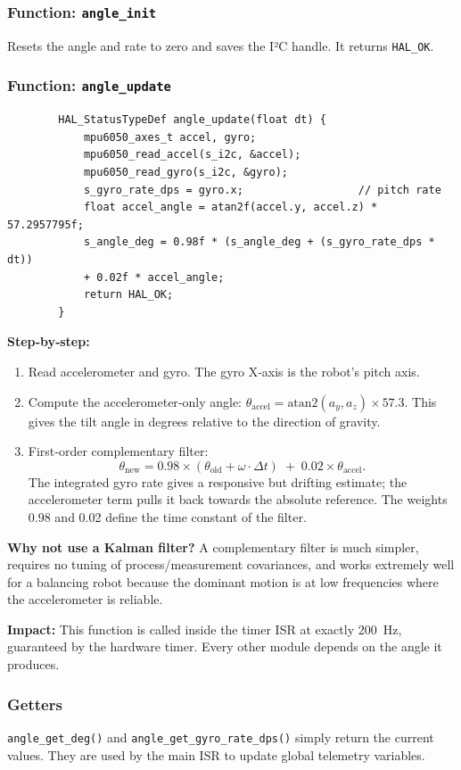 \documentclass[12pt,a4paper]{article}
\newcommand{\func}[1]{\texttt{#1}}
\begin{document}
	\subsubsection*{Function: \func{angle\_init}}
	Resets the angle and rate to zero and saves the I²C handle. It returns \texttt{HAL\_OK}.
	
	\newpage
	
	\subsubsection*{Function: \func{angle\_update}}
	\begin{lstlisting}
		HAL_StatusTypeDef angle_update(float dt) {
			mpu6050_axes_t accel, gyro;
			mpu6050_read_accel(s_i2c, &accel);
			mpu6050_read_gyro(s_i2c, &gyro);
			s_gyro_rate_dps = gyro.x;                  // pitch rate
			float accel_angle = atan2f(accel.y, accel.z) * 57.2957795f;
			s_angle_deg = 0.98f * (s_angle_deg + (s_gyro_rate_dps * dt))
			+ 0.02f * accel_angle;
			return HAL_OK;
		}
	\end{lstlisting}
	\textbf{Step‑by‑step:}
	\begin{enumerate}
		\item Read accelerometer and gyro. The gyro X‑axis is the robot’s pitch axis.
		\item Compute the accelerometer‑only angle: \(\theta_{\text{accel}} = \text{atan2}(a_y, a_z) \times 57.3\). This gives the tilt angle in degrees relative to the direction of gravity.
		\item First‑order complementary filter:
		\[
		\theta_{\text{new}} = 0.98 \times (\theta_{\text{old}} + \omega \cdot \Delta t) \;+\; 0.02 \times \theta_{\text{accel}}.
		\]
		The integrated gyro rate gives a responsive but drifting estimate; the accelerometer term pulls it back towards the absolute reference. The weights 0.98 and 0.02 define the time constant of the filter.
	\end{enumerate}
	\textbf{Why not use a Kalman filter?}  
	A complementary filter is much simpler, requires no tuning of process/measurement covariances, and works extremely well for a balancing robot because the dominant motion is at low frequencies where the accelerometer is reliable.
	
	\noindent\textbf{Impact:} This function is called inside the timer ISR at exactly \SI{200}{\hertz}, guaranteed by the hardware timer. Every other module depends on the angle it produces.
	\newpage 
	\subsubsection*{Getters}
	\texttt{angle\_get\_deg()} and \texttt{angle\_get\_gyro\_rate\_dps()} simply return the current values. They are used by the main ISR to update global telemetry variables.
	
\end{document}
